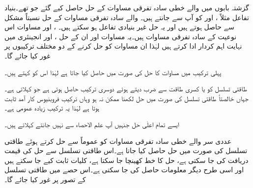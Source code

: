 گزشتہ بابوں میں  والے خطی سادہ تفرقی مساوات کے حل حاصل کیے گئے جو  تھے۔بنیاد تفاعل مثلاً ،  اور  کو آپ  سے جانتے ہیں۔ والے سادہ تفرقی مساوات کے حل نسبتاً مشکل سے حاصل ہوتے ہیں اور یہ حل غیر بنیادی تفاعل ہو سکتے ہیں۔ ،  اور  مساوات اس نوعیت کے سادہ تفرقی مساوات ہیں۔یہ مساوات اور ان کے حل ،  اور  انجینئری میں نہایت اہم کردار ادا کرتے ہیں لہٰذا ان مساوات کو حل کرنے کے دو مختلف ترکیبوں پر غور کیا جائے گا۔

پہلی ترکیب میں مساوات کا حل   کی صورت میں حاصل کیا جاتا ہے لہٰذا اس کو  کہتے ہیں۔

طاقتی تسلسل کو  یا کسری طاقت  سے ضرب دیتے ہوئے دوسری ترکیب حاصل ہوتی ہے جو  کہلاتی ہے۔جہاں خالصتاً طاقتی تسلسل کی صورت میں حل لکھنا ممکن نہ ہو وہاں ترکیب فروبنیوس کار آمد ثابت ہوتا ہے لہٰذا یہ ترکیب زیادہ عمومی ہے۔

ایسے تمام اعلٰی حل جنہیں آپ علم الاحصاء سے نہیں جانتے   کہلاتے ہیں۔

 عددی سر والے خطی سادہ تفرقی مساوات کو عموماً  سے حل کرتے ہوئے طاقتی تسلسل کی صورت میں حل حاصل کیا جاتا ہے۔اس طاقتی تسلسل سے حل کی قیمت دریافت کی جا سکتی ہے، حل کا خط کھینچا جا سکتا ہے، کلیات ثابت کیے جا سکتے ہیں اور اسی طرح دیگر معلومات حاصل کی جا سکتی ہے۔اس حصے میں طاقتی تسلسل کے تصور پر غور کیا جائے گا۔

